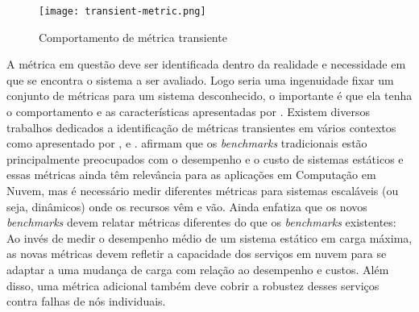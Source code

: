 \begin{figure}[!htb]
	\centering
	\texttt{[image: transient-metric.png]}
	\caption{Comportamento de métrica transiente}
	\label{fig:transient-metric}
\end{figure}

A métrica em questão deve ser identificada dentro da realidade e necessidade em que se encontra o sistema a ser avaliado. Logo seria uma ingenuidade fixar um conjunto de métricas para um sistema desconhecido, o importante é que ela tenha o comportamento e as características apresentadas por . Existem diversos trabalhos dedicados a identificação de métricas transientes em vários contextos como apresentado por ,  e .
 afirmam que os \textit{benchmarks} tradicionais estão principalmente preocupados com o desempenho e o custo de sistemas estáticos e essas métricas ainda têm relevância para as aplicações em Computação em Nuvem, mas é necessário medir diferentes métricas para sistemas escaláveis (ou seja, dinâmicos) onde os recursos vêm e vão. Ainda  enfatiza que os novos \textit{benchmarks} devem relatar métricas diferentes do que os \textit{benchmarks} existentes: 
	Ao invés de medir o desempenho médio de um sistema estático em carga máxima, as novas métricas devem refletir a capacidade dos serviços em nuvem para se adaptar a uma mudança de carga com relação ao desempenho e custos. Além disso, uma métrica adicional também deve cobrir a robustez desses serviços contra falhas de nós individuais.

